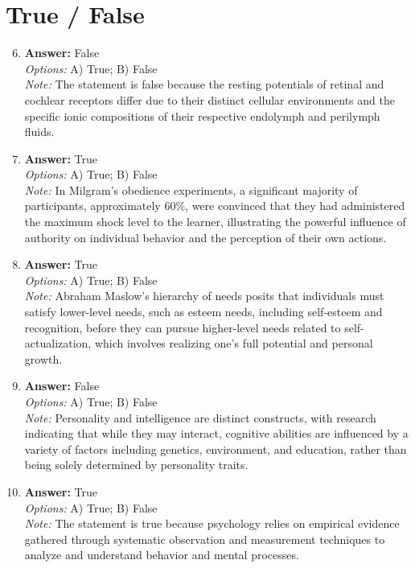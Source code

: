 \documentclass[12pt]{article}
\begin{document}
\section*{True / False}
\begin{enumerate}[label=\arabic*.]
\setcounter{enumi}{5}
\item \textbf{Answer:} False
\\ \textit{Options:} A) True; B) False
\\ \textit{Note:} The statement is false because the resting potentials of retinal and cochlear receptors differ due to their distinct cellular environments and the specific ionic compositions of their respective endolymph and perilymph fluids.
\item \textbf{Answer:} True
\\ \textit{Options:} A) True; B) False
\\ \textit{Note:} In Milgram's obedience experiments, a significant majority of participants, approximately 60\%, were convinced that they had administered the maximum shock level to the learner, illustrating the powerful influence of authority on individual behavior and the perception of their own actions.
\item \textbf{Answer:} True
\\ \textit{Options:} A) True; B) False
\\ \textit{Note:} Abraham Maslow's hierarchy of needs posits that individuals must satisfy lower-level needs, such as esteem needs, including self-esteem and recognition, before they can pursue higher-level needs related to self-actualization, which involves realizing one's full potential and personal growth.
\item \textbf{Answer:} False
\\ \textit{Options:} A) True; B) False
\\ \textit{Note:} Personality and intelligence are distinct constructs, with research indicating that while they may interact, cognitive abilities are influenced by a variety of factors including genetics, environment, and education, rather than being solely determined by personality traits.
\item \textbf{Answer:} True
\\ \textit{Options:} A) True; B) False
\\ \textit{Note:} The statement is true because psychology relies on empirical evidence gathered through systematic observation and measurement techniques to analyze and understand behavior and mental processes.
\end{enumerate}
\end{document}
